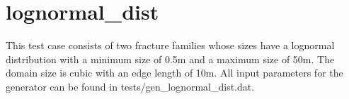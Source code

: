 \documentclass[letterpaper,10pt,english]{sphinxmanual}
\begin{document}
\begin{DUlineblock}{0em}
\item[] 
\item[] 
\end{DUlineblock}

\begin{figure}[htbp]
\centering

\noindent{}
\end{figure}

\begin{DUlineblock}{0em}
\item[] 
\item[] 
\end{DUlineblock}

\begin{figure}[htbp]
\centering

\noindent{}
\end{figure}

\begin{DUlineblock}{0em}
\item[] 
\item[] 
\end{DUlineblock}


\section{lognormal\_dist}
\label{\detokenize{tutorial:lognormal-dist}}
This test case consists of two fracture families whose sizes have a lognormal distribution with a minimum size of 0.5m and a maximum size of 50m. The domain size is cubic with an edge length of 10m. All input parameters for the generator can be found in tests/gen\_lognormal\_dist.dat.

\begin{figure}[htbp]
\centering

\noindent{}
\end{figure}

\begin{DUlineblock}{0em}
\item[] 
\item[] 
\end{DUlineblock}

\begin{figure}[htbp]
\centering

\noindent{}
\end{figure}
\end{document}
